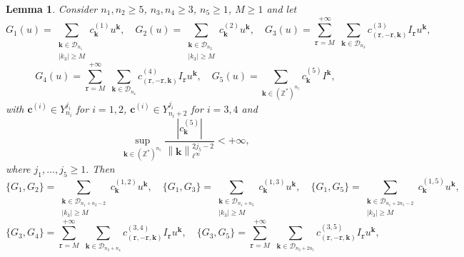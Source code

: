 \documentclass[a4paper,10pt,reqno]{article}
\theoremstyle{definition}
\theoremstyle{plain}
\theoremstyle{plain}
\theoremstyle{definition}
\theoremstyle{plain}
\theoremstyle{plain}
\theoremstyle{plain}
\newtheorem{lemma}[definition]{Lemma}
\theoremstyle{definition}
\theoremstyle{definition}
\newcommand{\norm}[1]{\left\lVert #1 \right\rVert}
\def \Z{\mathbb Z}
\def \k{\bm{k}}
\def \tr{\mathtt{r}}
\begin{document}
\begin{lemma} \label{lemma: parentesi tra resti è resto}
Consider $n_1,n_2 \ge 5$, $n_3,n_4 \ge 3$, $n_5 \ge 1$, $M \ge 1$ and let
\[
G_1(u) = \sum_{ \substack{ \k \in \mathcal{D}_{n_1} \\ |k_3| \ge M } } c_{\k}^{(1)} u^{\k}, \quad G_2(u) = \sum_{ \substack{ \k \in \mathcal{D}_{n_2} \\ |k_3| \ge M } } c_{\k}^{(2)} u^{\k}, \quad G_3(u) = \sum_{\tr = M}^{+\infty} \, \, \sum_{\k \in \mathcal{D}_{n_3}} c_{(\tr,-\tr,\k)}^{(3)} I_{\tr} u^{\k},
\]
\[
G_4(u) = \sum_{\tr = M}^{+\infty} \, \, \sum_{\k \in \mathcal{D}_{n_4}} c_{(\tr,-\tr,\k)}^{(4)} I_{\tr} u^{\k}, \quad G_5(u) = \sum_{\k \in (\Z^*)^{n_5}} c_{\k}^{(5)} I^{\k},
\]
with $\bm{c}^{(i)} \in Y_{n_i}^{j_i}$ for $i=1,2$, $\bm{c}^{(i)} \in Y_{n_i+2}^{j_i}$ for $i=3,4$ and 
\[
\sup_{\k \in (\Z^*)^{n_5}} \frac{|c_{\k}^{(5)}|}{\norm{\k}_{\ell^{\infty}}^{2j_5-2} } < +\infty,
\]
where $j_1,\ldots,j_5 \ge 1.$
Then
\[
\{ G_1 , G_2 \} = \sum_{ \substack{ \k \in \mathcal{D}_{n_1+n_2-2} \\ |k_3| \ge M } } c_{\k}^{(1,2)} u^{\k}, \quad \{ G_1 , G_3 \} = \sum_{ \substack{ \k \in \mathcal{D}_{n_1+n_3} \\ |k_3| \ge M } } c_{\k}^{(1,3)} u^{\k}, \quad \{ G_1 , G_5 \} = \sum_{ \substack{ \k \in \mathcal{D}_{n_1+2n_5-2} \\ |k_3| \ge M } } c_{\k}^{(1,5)} u^{\k},
\]
\[
\{ G_3 , G_4 \} = \sum_{\tr = M}^{+\infty} \, \, \sum_{\k \in \mathcal{D}_{n_3+n_4}} c_{(\tr,-\tr,\k)}^{(3,4)} I_{\tr} u^{\k}, \quad \{ G_3 , G_5 \} = \sum_{\tr = M}^{+\infty} \, \, \sum_{\k \in \mathcal{D}_{n_3+2n_5}} c_{(\tr,-\tr,\k)}^{(3,5)} I_{\tr} u^{\k},
\]
\end{lemma}
\end{document}
